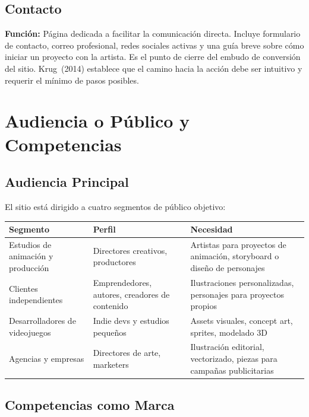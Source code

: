 \documentclass[12pt, letterpaper]{article}
\begin{document}
\subsection{Contacto}
\textbf{Función:} Página dedicada a facilitar la comunicación directa. Incluye formulario de contacto, correo profesional, redes sociales activas y una guía breve sobre cómo iniciar un proyecto con la artista. Es el punto de cierre del embudo de conversión del sitio. Krug~(2014) establece que el camino hacia la acción debe ser intuitivo y requerir el mínimo de pasos posibles.


\section{Audiencia o Público y Competencias}

\subsection{Audiencia Principal}

El sitio está dirigido a cuatro segmentos de público objetivo:

\vspace{6pt}
\begin{tabularx}{\textwidth}{L{3cm} L{3.5cm} X}
\toprule
{}
\textbf{Segmento} & \textbf{Perfil} & \textbf{Necesidad} \\
\midrule
Estudios de animación y producción & Directores creativos, productores & Artistas para proyectos de animación, storyboard o diseño de personajes \\
\addlinespace
Clientes independientes & Emprendedores, autores, creadores de contenido & Ilustraciones personalizadas, personajes para proyectos propios \\
\addlinespace
Desarrolladores de videojuegos & Indie devs y estudios pequeños & Assets visuales, concept art, sprites, modelado 3D \\
\addlinespace
Agencias y empresas & Directores de arte, marketers & Ilustración editorial, vectorizado, piezas para campañas publicitarias \\
\bottomrule
\end{tabularx}

\subsection{Competencias como Marca}
\end{document}
